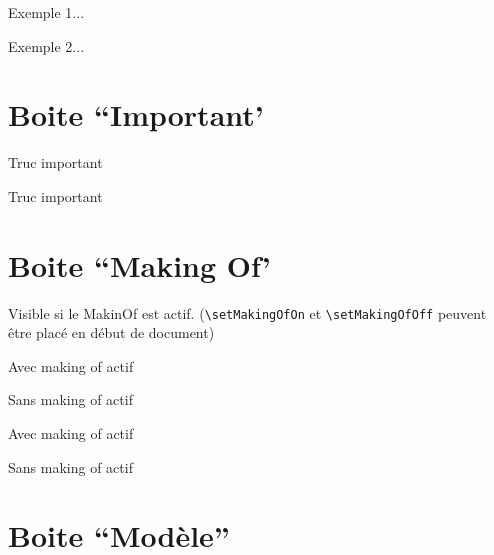 \documentclass[a4paper,12pt]{article}
\begin{document}
\begin{exemples*}
	\item Exemple 1...
	\item Exemple 2...
\end{exemples*}%






	\section{Boite ``Important'}

\begin{code}%
\begin{important}
	Truc important
\end{important}
\end{code}

\begin{important}
	Truc important
\end{important}%


	\section{Boite ``Making Of'}

	Visible si le MakinOf est actif. (\verb!\setMakingOfOn! et \verb!\setMakingOfOff! peuvent être placé en début de document)

\begin{code}%
\setMakingOfOn
\begin{makingOf}
	Avec making of actif
\end{makingOf}
\setMakingOfOff
\begin{makingOf}
	Sans making of actif
\end{makingOf}
\end{code}

\setMakingOfOn
\begin{makingOf}
	Avec making of actif
\end{makingOf}
\setMakingOfOff
\begin{makingOf}
	Sans making of actif
\end{makingOf}%


	\section{Boite ``Modèle''}
\end{document}
